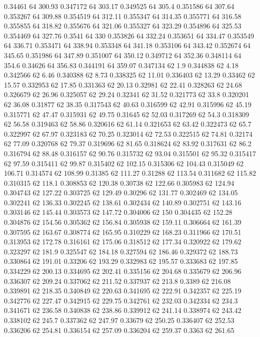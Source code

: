 0.34461 64 300.93
0.347172 64 303.17
0.349525 64 305.4
0.351586 64 307.64
0.353267 64 309.88
0.354519 64 312.11
0.355347 64 314.35
0.355771 64 316.58
0.355855 64 318.82
0.355676 64 321.06
0.355327 64 323.29
0.354896 64 325.53
0.354469 64 327.76
0.3541 64 330
0.353826 64 332.24
0.353651 64 334.47
0.353549 64 336.71
0.353471 64 338.94
0.353348 64 341.18
0.353106 64 343.42
0.352674 64 345.65
0.351986 64 347.89
0.351007 64 350.12
0.349712 64 352.36
0.348114 64 354.6
0.34626 64 356.83
0.344191 64 359.07
0.347134 62 1.9
0.344838 62 4.18
0.342566 62 6.46
0.340388 62 8.73
0.338325 62 11.01
0.336403 62 13.29
0.33462 62 15.57
0.332953 62 17.85
0.331363 62 20.13
0.32981 62 22.41
0.328263 62 24.68
0.326679 62 26.96
0.325057 62 29.24
0.32341 62 31.52
0.321773 62 33.8
0.320201 62 36.08
0.31877 62 38.35
0.317543 62 40.63
0.316599 62 42.91
0.315996 62 45.19
0.315771 62 47.47
0.315931 62 49.75
0.31645 62 52.03
0.317269 62 54.3
0.318309 62 56.58
0.319463 62 58.86
0.320616 62 61.14
0.321653 62 63.42
0.322473 62 65.7
0.322997 62 67.97
0.323183 62 70.25
0.323014 62 72.53
0.322515 62 74.81
0.32174 62 77.09
0.320768 62 79.37
0.319696 62 81.65
0.318624 62 83.92
0.317631 62 86.2
0.316794 62 88.48
0.316157 62 90.76
0.315732 62 93.04
0.315501 62 95.32
0.315417 62 97.59
0.315411 62 99.87
0.315402 62 102.15
0.315306 62 104.43
0.315049 62 106.71
0.314574 62 108.99
0.31385 62 111.27
0.31288 62 113.54
0.311682 62 115.82
0.310315 62 118.1
0.308853 62 120.38
0.30738 62 122.66
0.305983 62 124.94
0.304743 62 127.22
0.303725 62 129.49
0.30296 62 131.77
0.302469 62 134.05
0.302241 62 136.33
0.302245 62 138.61
0.302434 62 140.89
0.302751 62 143.16
0.303146 62 145.44
0.303573 62 147.72
0.304006 62 150
0.304435 62 152.28
0.304876 62 154.56
0.305362 62 156.84
0.305938 62 159.11
0.306664 62 161.39
0.307595 62 163.67
0.308774 62 165.95
0.310229 62 168.23
0.311966 62 170.51
0.313953 62 172.78
0.316161 62 175.06
0.318512 62 177.34
0.320922 62 179.62
0.323297 62 181.9
0.325547 62 184.18
0.327594 62 186.46
0.329372 62 188.73
0.330864 62 191.01
0.33206 62 193.29
0.332983 62 195.57
0.333683 62 197.85
0.334229 62 200.13
0.334695 62 202.41
0.335156 62 204.68
0.335679 62 206.96
0.336307 62 209.24
0.337062 62 211.52
0.337937 62 213.8
0.3389 62 216.08
0.339891 62 218.35
0.340849 62 220.63
0.341695 62 222.91
0.342357 62 225.19
0.342776 62 227.47
0.342915 62 229.75
0.342761 62 232.03
0.342334 62 234.3
0.341671 62 236.58
0.340838 62 238.86
0.339912 62 241.14
0.338974 62 243.42
0.338102 62 245.7
0.337362 62 247.97
0.33679 62 250.25
0.336407 62 252.53
0.336206 62 254.81
0.336154 62 257.09
0.336204 62 259.37
0.3363 62 261.65
